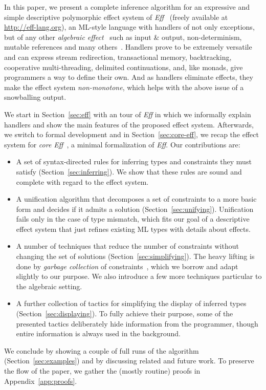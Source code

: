 \documentclass{LMCS}
\newcommand{\Eff}{\emph{Eff}\xspace}
\begin{document}
In this paper, we present a complete inference algorithm
for an expressive and simple descriptive polymorphic effect system of \Eff~\cite{bauer2012programming}
(freely available at \url{http://eff-lang.org}),
an ML-style language with handlers of not only exceptions, but of any other \emph{algebraic effect}~\cite{plotkin2003algebraic}
such as input \& output, non-determinism, mutable references and many others~\cite{plotkin2009handlers, bauer2012programming}.
Handlers prove to be extremely versatile and can express
  stream redirection,
  transactional memory,
  backtracking,
  cooperative multi-threading,
  delimited continuations,
and, like monads, give programmers a way to define their own.
And as handlers eliminate effects, they make the effect system \emph{non-monotone},
which helps with the above issue of a snowballing output.

We start in Section~\ref{sec:eff} with an tour of \Eff in which we informally explain handlers and show the main features of the proposed effect system.
Afterwards, we switch to formal development and in Section~\ref{sec:core-eff},
we recap the effect system for \emph{core Eff}~\cite{bauer2013effect},
a minimal formalization of \Eff.
Our contributions are:
\begin{itemize}
\item
  A set of syntax-directed rules for inferring types and constraints they must satisfy (Section~\ref{sec:inferring}).
  We show that these rules are sound and complete with regard to the effect system.
\item
  A unification algorithm that decomposes a set of constraints to a more basic form
  and decides if it admits a solution (Section~\ref{sec:unifying}).
  Unification fails only in the case of type mismatch,
  which fits our goal of a descriptive effect system
  that just refines existing ML types with details about effects.
\item
  A number of techniques that reduce the number of constraints without changing the set of solutions (Section~\ref{sec:simplifying}).
  The heavy lifting is done by \emph{garbage collection} of constraints~\cite{pottier2001simplifying, simonet2003type, trifonov1996subtyping},
  which we borrow and adapt slightly to our purpose.
  We also introduce a few more techniques particular to the algebraic setting.
\item
  A further collection of tactics for simplifying the display of inferred types (Section~\ref{sec:displaying}).
  To fully achieve their purpose,
  some of the presented tactics deliberately hide information from the programmer,
  though entire information is always used in the background.
\end{itemize}
We conclude by showing a couple of full runs of the algorithm (Section~\ref{sec:examples}) and by discussing related and future work.
To preserve the flow of the paper, we gather the (mostly routine) proofs in Appendix~\ref{app:proofs}.
\end{document}
